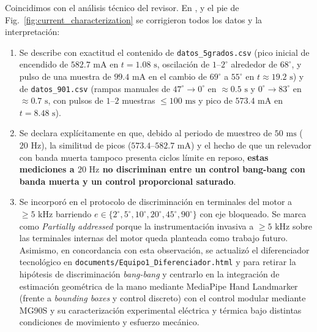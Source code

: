 \documentclass{LabDSTresponse}
\begin{document}
{Coincidimos con el análisis técnico del revisor. En ,  y el pie de Fig.~\ref{fig:current_characterization} se corrigieron todos los datos y la interpretación:
\begin{enumerate}
    \item Se describe con exactitud el contenido de \texttt{datos\_5grados.csv} (pico inicial de encendido de $582.7\text{ mA}$ en $t = 1.08\text{ s}$, oscilación de $1\text{--}2^\circ$ alrededor de $68^\circ$, y pulso de una muestra de $99.4\text{ mA}$ en el cambio de $69^\circ$ a $55^\circ$ en $t \approx 19.2\text{ s}$) y de \texttt{datos\_901.csv} (rampas manuales de $47^\circ \to 0^\circ$ en $\approx 0.5\text{ s}$ y $0^\circ \to 83^\circ$ en $\approx 0.7\text{ s}$, con pulsos de $1\text{--}2$ muestras $\le 100\text{ ms}$ y pico de $573.4\text{ mA}$ en $t = 8.48\text{ s}$).
    \item Se declara explícitamente en  que, debido al periodo de muestreo de $50\text{ ms}$ ($20\text{ Hz}$), la similitud de picos ($573.4\text{--}582.7\text{ mA}$) y el hecho de que un relevador con banda muerta tampoco presenta ciclos límite en reposo, \textbf{estas mediciones a $20\text{ Hz}$ no discriminan entre un control bang-bang con banda muerta y un control proporcional saturado}.
    \item Se incorporó en  el protocolo de discriminación en terminales del motor a $\ge 5\text{ kHz}$ barriendo $e \in \{2^\circ, 5^\circ, 10^\circ, 20^\circ, 45^\circ, 90^\circ\}$ con eje bloqueado. Se marca como \textit{Partially addressed} porque la instrumentación invasiva a $\ge 5\text{ kHz}$ sobre las terminales internas del motor queda planteada como trabajo futuro. Asimismo, en concordancia con esta observación, se actualizó el diferenciador tecnológico en \texttt{documents/Equipo1\_Diferenciador.html} y  para retirar la hipótesis de discriminación \textit{bang-bang} y centrarlo en la integración de estimación geométrica de la mano mediante MediaPipe Hand Landmarker (frente a \textit{bounding boxes} y control discreto) con el control modular mediante MG90S y su caracterización experimental eléctrica y térmica bajo distintas condiciones de movimiento y esfuerzo mecánico.
\end{enumerate}}
\end{document}
